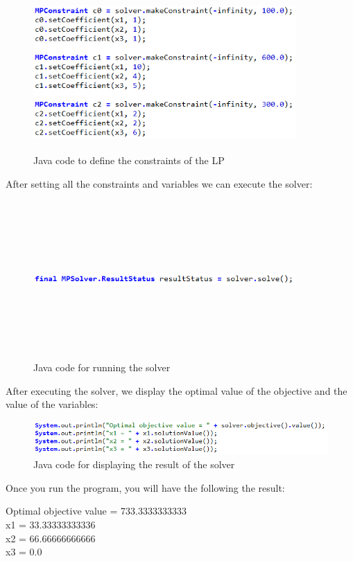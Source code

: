 \documentclass{report}
\begin{document}
\begin{figure}[H]
\centering
\includegraphics[width=10cm,height=6cm,keepaspectratio]{lp-constraints.png}
\caption{Java code to define the constraints of the LP}
\end{figure}
After setting all the constraints and variables we can execute the solver: \\
\begin{figure}[H]
\centering
\includegraphics[width=10cm,height=6cm,keepaspectratio]{lp-solve.png}
\caption{Java code for running the solver}
\end{figure}
After executing the solver, we display the optimal value of the objective and the value of the variables: \\
\begin{figure}[H]
\centering
\includegraphics[width=\textwidth]{lp-result.png}
\caption{Java code for displaying the result of the solver}
\end{figure}
Once you run the program, you will have the following the result: 
\begin{center}
Optimal objective value = 733.3333333333\\
x1 = 33.33333333336\\
x2 = 66.66666666666\\
x3 = 0.0\\
\end{center}
\end{document}
